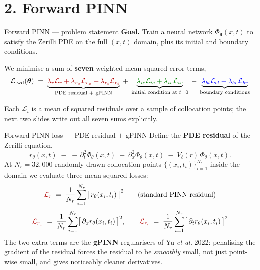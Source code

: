 \documentclass[aspectratio=169, 11pt]{beamer}
\begin{document}
\section{2. Forward PINN}

\begin{frame}{Forward PINN --- problem statement}
  \textbf{Goal.} Train a neural network
  $\Phi_{\boldsymbol{\theta}}(x,t)$ to satisfy the Zerilli PDE on the
  full $(x,t)$ domain, plus its initial and boundary conditions.
  \bigskip

  We minimise a sum of \textbf{seven} weighted mean-squared-error terms,
  \[
    \mathcal{L}_{\text{fwd}}(\boldsymbol{\theta})
    \;=\;
    \underbrace{\textcolor{darkred}{\lambda_{r}\mathcal{L}_{r}
      + \lambda_{r_x}\mathcal{L}_{r_x}
      + \lambda_{r_t}\mathcal{L}_{r_t}}}_{\text{PDE residual + gPINN}}
    \;+\;
    \underbrace{\textcolor{darkgreen}{\lambda_{ic}\mathcal{L}_{ic}
      + \lambda_{iv}\mathcal{L}_{iv}}}_{\text{initial condition at }t=0}
    \;+\;
    \underbrace{\textcolor{blue}{\lambda_{bl}\mathcal{L}_{bl}
      + \lambda_{br}\mathcal{L}_{br}}}_{\text{boundary conditions}}
  \]
  \bigskip

  Each $\mathcal{L}_i$ is a mean of squared residuals over a sample of
  collocation points; the next two slides write out all seven sums
  explicitly.
\end{frame}

\begin{frame}{Forward PINN loss --- PDE residual $+$ gPINN}
  \footnotesize
  Define the \textbf{PDE residual} of the Zerilli equation,
  \[
    r_{\theta}(x,t) \;\equiv\;
    -\,\partial_{t}^{2}\Phi_{\theta}(x,t)
    \;+\; \partial_{x}^{2}\Phi_{\theta}(x,t)
    \;-\; V_{\ell}(r)\,\Phi_{\theta}(x,t).
  \]
  At $N_{r}=32{,}000$ randomly drawn collocation points
  $\{(x_{i},t_{i})\}_{i=1}^{N_{r}}$ inside the domain we evaluate
  three mean-squared losses:
  \medskip
  \[
    \textcolor{darkred}{\mathcal{L}_{r}}
      \;=\; \frac{1}{N_{r}}\sum_{i=1}^{N_{r}}
            \bigl[\,r_{\theta}(x_{i},t_{i})\,\bigr]^{2}
    \qquad\text{(standard PINN residual)}
  \]
  \[
    \textcolor{darkred}{\mathcal{L}_{r_{x}}}
      \;=\; \frac{1}{N_{r}}\sum_{i=1}^{N_{r}}
            \bigl[\,\partial_{x} r_{\theta}(x_{i},t_{i})\,\bigr]^{2},
    \qquad
    \textcolor{darkred}{\mathcal{L}_{r_{t}}}
      \;=\; \frac{1}{N_{r}}\sum_{i=1}^{N_{r}}
            \bigl[\,\partial_{t} r_{\theta}(x_{i},t_{i})\,\bigr]^{2}
  \]
  \medskip
  The two extra terms are the \textbf{gPINN} regularisers of
  Yu \emph{et al.} 2022: penalising the gradient of the residual
  forces the residual to be \emph{smoothly} small, not just
  point-wise small, and gives noticeably cleaner derivatives.
\end{frame}
\end{document}
